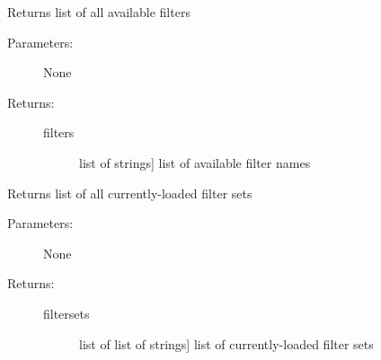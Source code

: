 \documentclass[letterpaper,10pt,english]{sphinxmanual}
\begin{document}
\begin{fulllineitems}
\begin{fulllineitems}
\begin{description}
\begin{description}
\end{description}

\end{description}

\end{fulllineitems}


\begin{fulllineitems}
\label{cluster_slug:slugpy.cluster_slug.cluster_slug.filters}
Returns list of all available filters
\begin{description}
\item[{Parameters:}] \leavevmode
None

\item[{Returns:}] \leavevmode\begin{description}
\item[{filters}] \leavevmode{[}list of strings{]}
list of available filter names

\end{description}

\end{description}

\end{fulllineitems}


\begin{fulllineitems}
\label{cluster_slug:slugpy.cluster_slug.cluster_slug.filtersets}
Returns list of all currently-loaded filter sets
\begin{description}
\item[{Parameters:}] \leavevmode
None

\item[{Returns:}] \leavevmode\begin{description}
\item[{filtersets}] \leavevmode{[}list of list of strings{]}
list of currently-loaded filter sets

\end{description}

\end{description}

\end{fulllineitems}



\end{fulllineitems}
\end{document}
